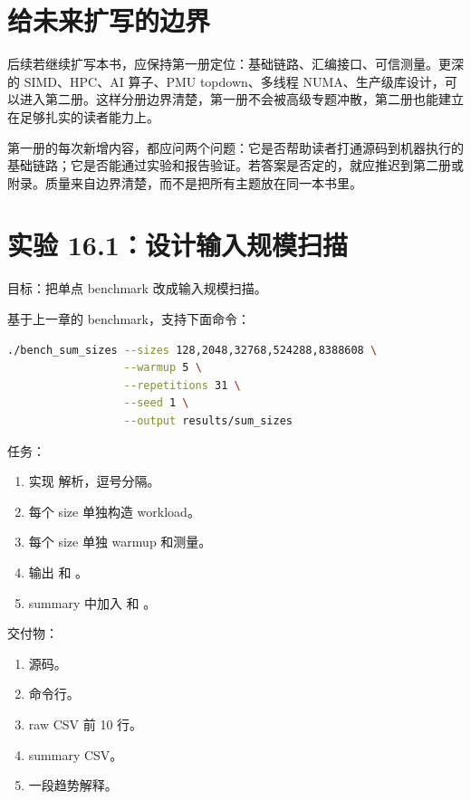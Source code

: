 \section{给未来扩写的边界}

后续若继续扩写本书，应保持第一册定位：基础链路、汇编接口、可信测量。更深的 SIMD、HPC、AI 算子、PMU topdown、多线程 NUMA、生产级库设计，可以进入第二册。这样分册边界清楚，第一册不会被高级专题冲散，第二册也能建立在足够扎实的读者能力上。

第一册的每次新增内容，都应问两个问题：它是否帮助读者打通源码到机器执行的基础链路；它是否能通过实验和报告验证。若答案是否定的，就应推迟到第二册或附录。质量来自边界清楚，而不是把所有主题放在同一本书里。

\section{实验 16.1：设计输入规模扫描}

\begin{labbox}
目标：把单点 benchmark 改成输入规模扫描。

基于上一章的  benchmark，支持下面命令：

\begin{lstlisting}[language=bash]
./bench_sum_sizes --sizes 128,2048,32768,524288,8388608 \
                  --warmup 5 \
                  --repetitions 31 \
                  --seed 1 \
                  --output results/sum_sizes
\end{lstlisting}

任务：

\begin{enumerate}
  \item 实现  解析，逗号分隔。
  \item 每个 size 单独构造 workload。
  \item 每个 size 单独 warmup 和测量。
  \item 输出  和 。
  \item summary 中加入 \code{GBps} 和 。
\end{enumerate}

交付物：

\begin{enumerate}
  \item 源码。
  \item 命令行。
  \item raw CSV 前 10 行。
  \item summary CSV。
  \item 一段趋势解释。
\end{enumerate}
\end{labbox}

